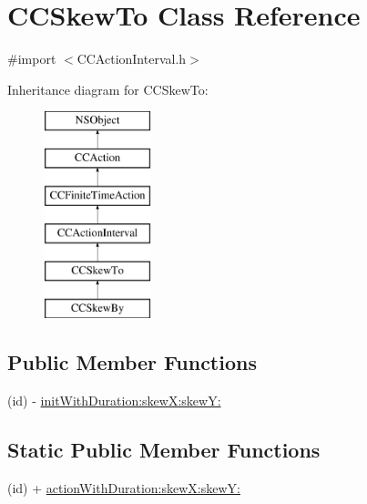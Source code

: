 \hypertarget{interface_c_c_skew_to}{\section{C\-C\-Skew\-To Class Reference}
\label{interface_c_c_skew_to}
}


{\ttfamily \#import $<$C\-C\-Action\-Interval.\-h$>$}

Inheritance diagram for C\-C\-Skew\-To\-:\begin{figure}[H]
\begin{center}
\leavevmode
\includegraphics[height=6.000000cm]{interface_c_c_skew_to}
\end{center}
\end{figure}
\subsection*{Public Member Functions}
\begin{DoxyCompactItemize}
\item 
(id) -\/ \hyperlink{interface_c_c_skew_to_aed9ba699432171afbf92b6bdd7ad6267}{init\-With\-Duration\-:skew\-X\-:skew\-Y\-:}
\end{DoxyCompactItemize}
\subsection*{Static Public Member Functions}
\begin{DoxyCompactItemize}
\item 
(id) + \hyperlink{interface_c_c_skew_to_aa98c5717f1ec1ec3f623ae510890a615}{action\-With\-Duration\-:skew\-X\-:skew\-Y\-:}
\end{DoxyCompactItemize}
